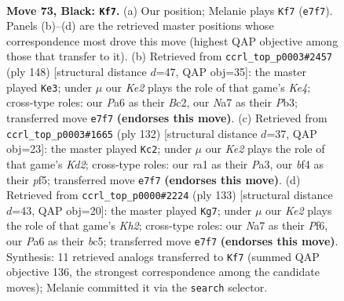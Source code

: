 \documentclass[11pt]{article}
\begin{document}
\clearpage

\begin{figure}[p]\centering
\begin{subfigure}{0.46\textwidth}\centering
\resizebox{\linewidth}{!}{%
\newchessgame
\chessboard[
  setfen={7K/n1P1k3/p1r5/P4p1p/4pBb1/6P1/8/RN6 b - - 53 73},
  showmover=false,
  pgfstyle=straightmove, color=movearrow, markmove={e7-f7}
]}
\caption{}
\end{subfigure}\hfill
\begin{subfigure}{0.46\textwidth}\centering
\resizebox{\linewidth}{!}{%
\newchessgame
\chessboard[
  setfen={1r6/4b1k1/3pP3/3P4/1pR1K3/1Pp5/2B5/8 w - - 20 75},
  showmover=false,
  pgfstyle=straightmove, color=movearrow, markmove={e4-e3}
]}
\caption{}
\end{subfigure}
\\[4pt]
\begin{subfigure}{0.46\textwidth}\centering
\resizebox{\linewidth}{!}{%
\newchessgame
\chessboard[
  setfen={1r2b3/6pk/2p1P3/R2p1pB1/p2P1P1P/P7/3K4/8 w - - 3 67},
  showmover=false,
  pgfstyle=straightmove, color=movearrow, markmove={d2-c2}
]}
\caption{}
\end{subfigure}\hfill
\begin{subfigure}{0.46\textwidth}\centering
\resizebox{\linewidth}{!}{%
\newchessgame
\chessboard[
  setfen={3R4/7k/2p1rp2/2Bb2p1/7p/2P4P/5PPK/8 b - - 43 67},
  showmover=false,
  pgfstyle=straightmove, color=movearrow, markmove={h7-g7}
]}
\caption{}
\end{subfigure}
\caption{\textbf{Move 73, Black: \texttt{Kf7}.} (a) Our position; Melanie plays \texttt{Kf7} (\texttt{e7f7}). Panels (b)--(d) are the retrieved master positions whose correspondence most drove this move (highest QAP objective among those that transfer to it). (b) Retrieved from \texttt{ccrl\_top\_p0003\#2457} (ply 148) [structural distance $d$=47, QAP obj=35]: the master played \texttt{Ke3}; under $\mu$ our \emph{Ke2} plays the role of that game's \emph{Ke4}; cross-type roles: our \emph{P}a6 as their \emph{B}c2, our \emph{N}a7 as their \emph{P}b3; transferred move \texttt{e7f7} \textbf{(endorses this move)}. (c) Retrieved from \texttt{ccrl\_top\_p0003\#1665} (ply 132) [structural distance $d$=37, QAP obj=23]: the master played \texttt{Kc2}; under $\mu$ our \emph{Ke2} plays the role of that game's \emph{Kd2}; cross-type roles: our \emph{r}a1 as their \emph{P}a3, our \emph{b}f4 as their \emph{p}f5; transferred move \texttt{e7f7} \textbf{(endorses this move)}. (d) Retrieved from \texttt{ccrl\_top\_p0000\#2224} (ply 133) [structural distance $d$=43, QAP obj=20]: the master played \texttt{Kg7}; under $\mu$ our \emph{Ke2} plays the role of that game's \emph{Kh2}; cross-type roles: our \emph{N}a7 as their \emph{P}f6, our \emph{P}a6 as their \emph{b}c5; transferred move \texttt{e7f7} \textbf{(endorses this move)}. Synthesis: 11 retrieved analogs transferred to \texttt{Kf7} (summed QAP objective 136, the strongest correspondence among the candidate moves); Melanie committed it via the \texttt{search} selector.}
\label{fig:thought-m145}
\end{figure}
\end{document}
